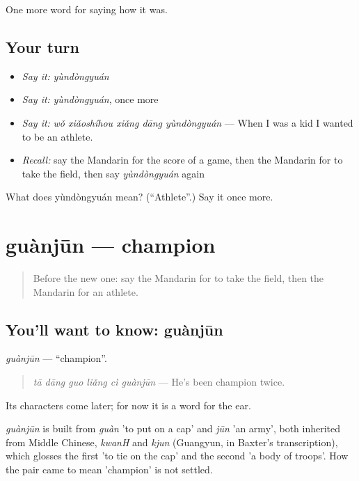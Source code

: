 \begin{grammarlens}[title={What you've built}]
One more word for saying how it was.
\end{grammarlens}

\subsection*{Your turn}
\begin{itemize}
\raggedright
  \item \emph{Say it:} \emph{yùndòngyuán}
  \item \emph{Say it:} \emph{yùndòngyuán}, once more
  \item \emph{Say it:} \emph{wǒ xiǎoshíhou xiǎng dāng yùndòngyuán} — When I was a kid I wanted to be an athlete.
  \item \emph{Recall:} say the Mandarin for the score of a game, then the Mandarin for to take the field, then say \emph{yùndòngyuán} again
\end{itemize}

\begin{tcolorbox}[breakable,colback=teal!4,colframe=teal!35!black,title={Before you move on}]
What does yùndòngyuán mean? (\textquotedblleft{}Athlete\textquotedblright{}.) Say it once more.
\end{tcolorbox}
\section[guànjūn]{guànjūn — champion}

\label{lesson:ZH-C501-guanjun}



\begin{quote}
Before the new one: say the Mandarin for to take the field, then the Mandarin for an athlete.
\end{quote}

\subsection*{You'll want to know: guànjūn}
\emph{guànjūn} — \textquotedblleft{}champion\textquotedblright{}.

\begin{quote}
\emph{tā dāng guo liǎng cì guànjūn} — He's been champion twice.
\end{quote}

Its characters come later; for now it is a word for the ear.

\begin{cousinweb}
\emph{guànjūn} is built from \emph{guàn} 'to put on a cap' and \emph{jūn} 'an army', both inherited from Middle Chinese, \emph{kwanH} and \emph{kjun} (Guangyun, in Baxter's transcription), which glosses the first 'to tie on the cap' and the second 'a body of troops'. How the pair came to mean 'champion' is not settled.
\end{cousinweb}

